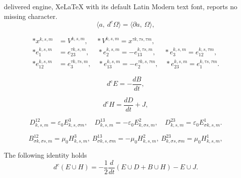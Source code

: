 \documentclass[10pt,a4paper]{amsart}
\begin{document}
delivered engine, XeLaTeX with its default Latin Modern text font, reports no missing character.
\begin{equation}\label{2.6}
\langle a,  \ d^c \Omega\rangle=\langle \partial a,  \ \Omega\rangle,
\end{equation}

\begin{align}\label{2.12}
\ast x^{k,s,m}&=V^{k,s,m}, \ \quad \ast V^{k,s,m}=x^{\tau k,\tau s,\tau m}, \nonumber \\
\ast e^{k,s,m}_1&=e^{\tau k,s,m}_{23}, \ \quad \ast e^{k,s,m}_2=-e^{k,\tau s,m}_{13}, \
\quad \ast e^{k,s,m}_3=e^{k,s,\tau m}_{12}, \nonumber \\
\ast e^{k,s, m}_{12}&=e^{\tau k,\tau s,m}_3, \quad \ast e^{k,s, m}_{13}=-e^{\tau k,s,\tau m}_2, \quad \ast e^{k,s, m}_{23}=e^{k,\tau s,\tau m}_1.
\end{align}

\begin{equation}\label{3.7}
  d^c E=-\frac{dB}{dt},
 \end{equation}

 \begin{equation}\label{3.8}
 d^cH=\frac{d D}{dt}+J,
 \end{equation}

 \begin{equation}\label{3.12}
D^{12}_{k,s,m}=\varepsilon_0E^3_{k,s,\sigma m}, \quad D^{13}_{k,s,m}=-\varepsilon_0E^2_{k,\sigma s, m}, \quad D^{23}_{k,s,m}=\varepsilon_0E^1_{\sigma k,s, m}.
\end{equation}

\begin{equation}\label{3.13}
B^{12}_{\sigma k,\sigma s,m}=\mu_0H^3_{k,s, m}, \ B^{13}_{\sigma k,s,\sigma m}=-\mu_0H^2_{k,s, m}, \
 B^{23}_{k,\sigma s, \sigma m}=\mu_0H^1_{k,s, m},
\end{equation}

\begin{prop}
The following identity holds
 \begin{equation}\label{3.15}
d^c(E\cup H)=-\frac{1}{2}\frac{d}{dt}(E\cup D+B\cup H)-E\cup J.
\end{equation}
\end{prop}
\end{document}
